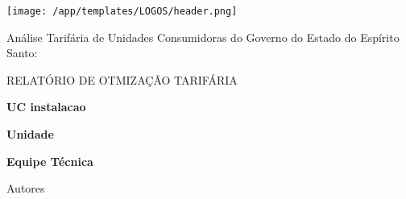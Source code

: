 \documentclass[a4paper,12pt]{abntex2}
\renewcommand{\arraystretch}{1.3}
\begin{document}
\cleardoublepage

    \thispagestyle{empty}
    \vspace*{-2.5cm}
    \begin{center}
        \texttt{[image: /app/templates/LOGOS/header.png]}
        \vspace{1cm}
    
        \noindent

        \Large{Análise Tarifária de Unidades Consumidoras do Governo do Estado do Espírito Santo:}

        \vspace{1.5cm}
    
        \large{RELATÓRIO DE OTMIZAÇÃO TARIFÁRIA}

        \vspace{1.0cm}

        \textbf{ UC {{ instalacao }} }

        \vspace{1.0cm}

        \textbf{ {{ Unidade }} }

        \vspace{1.5cm}
        
        \textbf{Equipe Técnica}

        \small{ {{ Autores }} }
    \end{center}  
    
    \vspace{1cm}

    \noindent

    \begin{table}[!ht]
        \centering
        \setlength{\tabcolsep}{5pt}
        \renewcommand{\arraystretch}{1.3}
    \end{table} 
    \vfill
    
\end{document}
